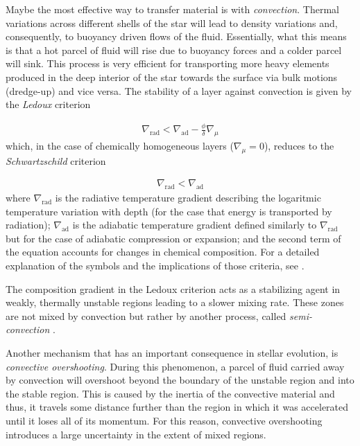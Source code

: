 \documentclass[../../main/thesis_msc.tex]{subfiles}
\begin{document}
						Maybe the most effective way to transfer material is with \emph{convection}. Thermal variations across different shells of the star will lead to density variations and, consequently, to buoyancy driven flows of the fluid. Essentially, what this means is that a hot parcel of fluid will rise due to buoyancy forces and a colder parcel will sink. This process is very efficient for transporting more heavy elements produced in the deep interior of the star towards the surface via bulk motions (dredge-up) and vice versa. The stability of a layer against convection is given by the \emph{Ledoux} criterion
						
						\begin{eqnarray}
							\nabla_{\text{rad}} < \nabla_{\text{ad}} - \frac{\phi}{\delta} \nabla_{\mu}
						\end{eqnarray}
						which, in the case of chemically homogeneous layers ($\nabla_{\mu} = 0$), reduces to the \emph{Schwartzschild} criterion
						
						\begin{eqnarray}
							\nabla_{\text{rad}} < \nabla_{\text{ad}}
						\end{eqnarray}
						where $\nabla_{\text{rad}}$ is the radiative temperature gradient describing the logaritmic temperature variation with depth (for the case that energy is transported by radiation); $\nabla_{\text{ad}}$ is the adiabatic temperature gradient defined similarly to $\nabla_{\text{rad}}$ but for the case of adiabatic compression or expansion; and the second term of the equation accounts for changes in chemical composition. For a detailed explanation of the symbols and the implications of those criteria, see \cite[pp.~49-51]{Kipp_book}.
						
						The composition gradient in the Ledoux criterion acts as a stabilizing agent in weakly, thermally unstable regions leading to a slower mixing rate. These zones are not mixed by convection but rather by another process, called \emph{semi-convection} \citep[see][]{Spruit2013, Langer1991}.
						
						Another mechanism that has an important consequence in stellar evolution, is \emph{convective overshooting}. During this phenomenon, a parcel of fluid carried away by convection will overshoot beyond the boundary of the unstable region and into the stable region. This is caused by the inertia of the convective material and thus, it travels some distance further than the region in which it was accelerated until it loses all of its momentum. For this reason, convective overshooting introduces a large uncertainty in the extent of mixed regions.
						
\end{document}
